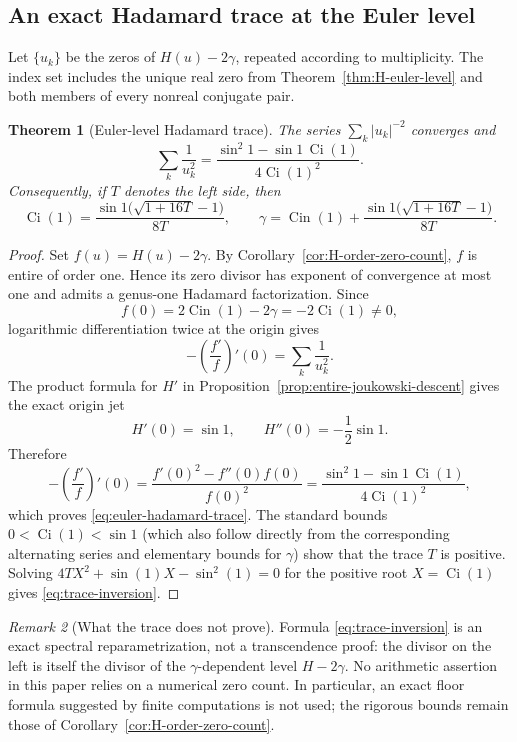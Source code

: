 \documentclass[11pt]{article}
\newtheorem{theorem}{Theorem}[section]
\theoremstyle{definition}
\theoremstyle{remark}
\newtheorem{remark}[theorem]{Remark}
\newcommand{\Cin}{\operatorname{Cin}}
\newcommand{\Ci}{\operatorname{Ci}}
\begin{document}
\subsection{An exact Hadamard trace at the Euler level}

Let $\{u_k\}$ be the zeros of $H(u)-2\gamma$, repeated according to
multiplicity.  The index set includes the unique real zero from
Theorem~\ref{thm:H-euler-level} and both members of every nonreal conjugate
pair.

\begin{theorem}[Euler-level Hadamard trace]
\label{thm:euler-hadamard-trace}
The series $\sum_k |u_k|^{-2}$ converges and
\begin{equation}\label{eq:euler-hadamard-trace}
 \boxed{
 \sum_k\frac{1}{u_k^2}
 =\frac{\sin^2 1-\sin 1\,\Ci(1)}{4\Ci(1)^2}.}
\end{equation}
Consequently, if $T$ denotes the left side, then
\begin{equation}\label{eq:trace-inversion}
 \Ci(1)=
 \frac{\sin 1\bigl(\sqrt{1+16T}-1\bigr)}{8T},
 \qquad
 \gamma=\Cin(1)+
 \frac{\sin 1\bigl(\sqrt{1+16T}-1\bigr)}{8T}.
\end{equation}
\end{theorem}

\begin{proof}
Set $f(u)=H(u)-2\gamma$.  By
Corollary~\ref{cor:H-order-zero-count}, $f$ is entire of order one.  Hence
its zero divisor has exponent of convergence at most one and admits a
genus-one Hadamard factorization.  Since
\[
 f(0)=2\Cin(1)-2\gamma=-2\Ci(1)\ne0,
\]
logarithmic differentiation twice at the origin gives
\begin{equation}\label{eq:hadamard-log-derivative}
 -\left(\frac{f'}f\right)'(0)=\sum_k\frac1{u_k^2}.
\end{equation}
The product formula for $H'$ in
Proposition~\ref{prop:entire-joukowski-descent} gives the exact origin jet
\[
 H'(0)=\sin 1,
 \qquad
 H''(0)=-\frac12\sin 1.
\]
Therefore
\[
 -\left(\frac{f'}f\right)'(0)
 =\frac{f'(0)^2-f''(0)f(0)}{f(0)^2}
 =\frac{\sin^2 1-\sin 1\,\Ci(1)}{4\Ci(1)^2},
\]
which proves \eqref{eq:euler-hadamard-trace}.  The standard bounds
$0<\Ci(1)<\sin 1$ (which also follow directly from the corresponding
alternating series and elementary bounds for $\gamma$) show that the trace
$T$ is positive.  Solving
$4T X^2+\sin(1)X-\sin^2(1)=0$ for the positive root
$X=\Ci(1)$ gives \eqref{eq:trace-inversion}.
\end{proof}

\begin{remark}[What the trace does not prove]
Formula \eqref{eq:trace-inversion} is an exact spectral reparametrization,
not a transcendence proof: the divisor on the left is itself the divisor of
the $\gamma$-dependent level $H-2\gamma$.  No arithmetic assertion in this
paper relies on a numerical zero count.  In particular, an exact floor
formula suggested by finite computations is not used; the rigorous bounds
remain those of Corollary~\ref{cor:H-order-zero-count}.
\end{remark}
\end{document}
